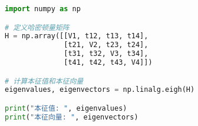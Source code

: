 \begin{lstlisting}[language=python]
import numpy as np

# 定义哈密顿量矩阵
H = np.array([[V1, t12, t13, t14],
              [t21, V2, t23, t24],
              [t31, t32, V3, t34],
              [t41, t42, t43, V4]])

# 计算本征值和本征向量
eigenvalues, eigenvectors = np.linalg.eigh(H)

print("本征值: ", eigenvalues)
print("本征向量: ", eigenvectors)

\end{lstlisting}
